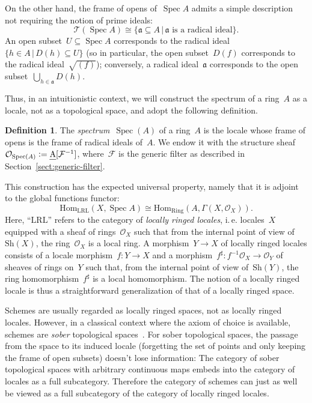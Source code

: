 \documentclass[10pt,reqno,a4paper]{amsbook}
\makeatletter
\theoremstyle{definition}
\newtheorem{defn}{Definition}[section]
\theoremstyle{plain}
\theoremstyle{remark}
\newcommand{\F}{\mathcal{F}}
\renewcommand{\O}{\mathcal{O}}
\newcommand{\T}{\mathcal{T}}
\newcommand{\aaa}{\mathfrak{a}}
\newcommand{\Hom}{\mathrm{Hom}}
\let\oldul\ul
\renewcommand{\ul}[1]{\text{\oldul{$#1$}}}
\newcommand{\Sh}{\mathrm{Sh}}
\newcommand{\Ring}{\mathrm{Ring}}
\newcommand{\LRL}{\mathrm{LRL}}
\DeclareMathOperator{\Spec}{Spec}
\newcommand{\Open}{\T}
\newcommand{\?}{\,{:}\,}
\renewcommand{\_}{\mathpunct{.}\,}
\newcommand{\ie}{i.\,e.\@\xspace}
\newcommand{\stacksproject}[1]{\cite[{\href{https://stacks.math.columbia.edu/tag/#1}{Tag~#1}}]{stacks-project}}
\newcommand{\defeq}{\vcentcolon=}
\makeatother
\begin{document}
On the other hand, the frame of opens of~$\Spec A$ admits a simple
description not requiring the notion of prime ideals:
\[ \Open(\Spec A) \cong \{ \aaa \subseteq A \,|\,
  \text{$\aaa$ is a radical ideal} \}. \]
An open subset~$U \subseteq \Spec A$ corresponds to the radical ideal~$\{ h \in
A \,|\, D(h) \subseteq U \}$ (so in particular, the open subset~$D(f)$
corresponds to the radical ideal~$\sqrt{(f)}$); conversely, a radical ideal~$\aaa$
corresponds to the open subset~$\bigcup_{h \in \aaa} D(h)$.

Thus, in an intuitionistic context, we will construct the spectrum of a ring~$A$
as a locale, not as a topological space, and adopt the following definition.

\begin{defn}\label{defn:spectrum-as-a-locale}
The \emph{spectrum}~$\Spec(A)$ of a ring~$A$ is the locale whose frame of
opens is the frame of radical ideals of~$A$. We endow it with the structure
sheaf~$\O_{\Spec(A)} \defeq \ul{A}[\F^{-1}]$, where~$\F$ is the generic filter
as described in Section~\ref{sect:generic-filter}.\end{defn}

This construction has the expected
universal property, namely that it is adjoint to the global functions functor:
\[ \Hom_{\LRL}(X, \Spec A) \cong \Hom_{\Ring}(A, \Gamma(X,\O_X)). \]
Here, ``$\LRL$'' refers to the category of \emph{locally ringed locales}, \ie
locales~$X$ equipped with a sheaf of rings~$\O_X$ such that from the internal point of
view of~$\Sh(X)$, the ring~$\O_X$ is a local ring. A morphism~$Y \to X$ of
locally ringed locales consists of a locale morphism~$f : Y \to X$ and a
morphism~$f^\sharp : f^{-1} \O_X \to \O_Y$ of sheaves of rings on~$Y$ such that, from the
internal point of view of~$\Sh(Y)$, the ring homomorphism~$f^\sharp$ is a local
homomorphism. The notion of a locally ringed locale is thus a straightforward
generalization of that of a locally ringed space.

Schemes are usually regarded as locally ringed spaces, not
as locally ringed locales. However, in a classical
context where the axiom of choice is available, schemes are \emph{sober}
topological spaces~\stacksproject{01IS}. For sober topological spaces, the passage from the space to
its induced locale (forgetting the set of points and only keeping the frame of
open subsets) doesn't lose information: The category of sober topological
spaces with arbitrary continuous maps embeds into the category of locales as a
full subcategory. Therefore the category of schemes can just as well be viewed
as a full subcategory of the category of locally ringed locales.
\end{document}
